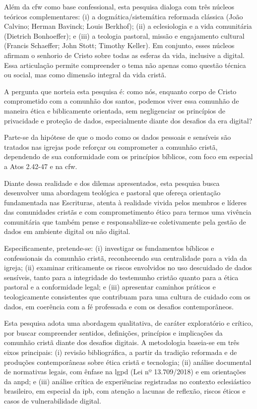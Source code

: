 Além da \gls{cfw} como base confessional, esta pesquisa dialoga com três núcleos teóricos complementares: (i) a dogmática/sistemática reformada clássica (João Calvino; Herman Bavinck; Louis Berkhof); (ii) a eclesiologia e a vida comunitária (Dietrich Bonhoeffer); e (iii) a teologia pastoral, missão e engajamento cultural (Francis Schaeffer; John Stott; Timothy Keller). Em conjunto, esses núcleos afirmam o senhorio de Cristo sobre todas as esferas da vida, inclusive a digital. Essa articulação permite compreender o tema não apenas como questão técnica ou social, mas como dimensão integral da vida cristã.

A pergunta que norteia esta pesquisa é: como nós, enquanto corpo de Cristo comprometido com a comunhão dos santos, podemos viver essa comunhão de maneira ética e biblicamente orientada, sem negligenciar os princípios de privacidade e proteção de dados, especialmente diante dos desafios da era digital?

Parte-se da hipótese de que o modo como os dados pessoais e sensíveis são tratados nas igrejas pode reforçar ou comprometer a comunhão cristã, dependendo de sua conformidade com os princípios bíblicos, com foco em especial a Atos 2.42-47 e na \gls{cfw}.

Diante dessa realidade e dos dilemas apresentados, esta pesquisa busca desenvolver uma abordagem teológica e pastoral que ofereça orientação fundamentada nas Escrituras, atenta à realidade vivida pelos membros e líderes das comunidades cristãs e com comprometimento ético para termos uma vivência comunitária que também pense e responsabilize-se coletivamente pela gestão de dados em ambiente digital ou não digital.

Especificamente, pretende-se: (i) investigar os fundamentos bíblicos e confessionais da comunhão cristã, reconhecendo sua centralidade para a vida da igreja; (ii) examinar criticamente os riscos envolvidos no uso descuidado de dados sensíveis, tanto para a integridade do testemunho cristão quanto para a ética pastoral e a conformidade legal; e (iii) apresentar caminhos práticos e teologicamente consistentes que contribuam para uma cultura de cuidado com os dados, em coerência com a fé professada e com os desafios contemporâneos.

Esta pesquisa adota uma abordagem qualitativa, de caráter exploratório e crítico, por buscar compreender sentidos, definições, princípios e implicações da comunhão cristã diante dos desafios digitais. A metodologia baseia-se em três eixos principais: (i) revisão bibliográfica, a partir da tradição reformada e de produções contemporâneas sobre ética cristã e tecnologia; (ii) análise documental de normativas legais, com ênfase na \gls{lgpd} (Lei nº 13.709/2018) e em orientações da \gls{anpd}; e (iii) análise crítica de experiências registradas no contexto eclesiástico brasileiro, em especial da \gls{ipb}, com atenção a lacunas de reflexão, riscos éticos e casos de vulnerabilidade digital.

